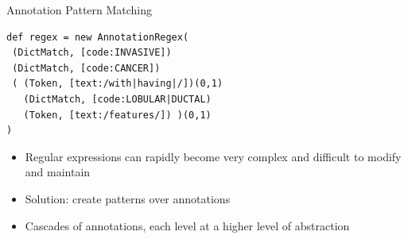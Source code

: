 \documentclass[10pt]{beamer}
\begin{document}
\begin{frame}[fragile]{Annotation Pattern Matching}

\begin{lstlisting}[frame=single]
def regex = new AnnotationRegex(
 (DictMatch, [code:INVASIVE])
 (DictMatch, [code:CANCER])
 ( (Token, [text:/with|having|/])(0,1)
   (DictMatch, [code:LOBULAR|DUCTAL)
   (Token, [text:/features/]) )(0,1)
)
\end{lstlisting}

\begin{itemize}
	\item Regular expressions can rapidly become very complex and difficult to modify and maintain
	\item Solution: create \alert{patterns} over annotations
	\item Cascades of annotations, each level at a higher level of abstraction
\end{itemize}

\end{frame}

%
%
%
\end{document}
